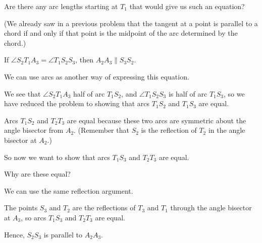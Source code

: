 Are there any arc lengths starting at $T_1$ that would give us such an equation?





(We already saw in a previous problem that the tangent at a point is parallel to a chord if and only if that point is the midpoint of the arc determined by the chord.)

If $\angle S_2T_1A_3 = \angle T_1S_2S_3$, then $A_2A_3 \parallel S_3S_2$.

We can use arcs as another way of expressing this equation.

We see that $\angle S_2 T_1 A_3$ half of arc $T_1 S_2$, and $\angle T_1 S_2 S_3$ is half of arc $T_1 S_3$, so we have reduced the problem to showing that arcs $T_1 S_2$ and $T_1 S_3$ are equal.

Arcs $T_1 S_2$ and $T_2 T_3$ are equal because these two arcs are symmetric about the angle bisector from $A_2$. (Remember that $S_2$ is the reflection of $T_2$ in the angle bisector at $A_2$.)

So now we want to show that arcs $T_1 S_3$ and $T_2 T_3$ are equal.

Why are these equal?

We can use the same reflection argument.

The points $S_3$ and $T_2$ are the reflections of $T_3$ and $T_1$ through the angle bisector at $A_3$, so arcs $T_1 S_3$ and $T_2 T_3$ are equal.

Hence, $S_2 S_3$ is parallel to $A_2 A_3$.

